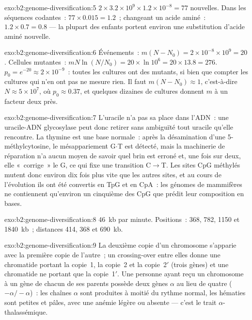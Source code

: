 \begin{solution}{exo:b2:genome-diversification:5}
$2\times 3.2\times 10^{9}\times 1.2\times 10^{-8} = 77$ 
nouvelles. Dans les séquences codantes~: $77\times 0.015 = 1.2$~;
changeant un acide aminé~: $1.2\times 0.7 = 0.8$ --- la plupart des
enfants portent environ une substitution d'acide aminé nouvelle.
\end{solution}

\begin{solution}{exo:b2:genome-diversification:6}
Événements~: $m(N - N_0) = 2\times 10^{-8}\times 10^{9} = 20$. Cellules
mutantes~: $mN\ln(N/N_0) = 20\times \ln 10^{6} = 20\times 13.8 = 276$.
$p_0 = e^{-20} \approx 2\times 10^{-9}$~: toutes les cultures ont des
mutants, si bien que compter les cultures qui n'en ont pas ne mesure
rien. Il faut $m(N -
N_0) \approx 1$, c'est-à-dire $N \approx 5\times 10^{7}$, où $p_0 \approx
0.37$, et quelques dizaines de cultures donnent $m$ à un facteur deux
près.
\end{solution}

\begin{solution}{exo:b2:genome-diversification:7}
L'uracile n'a pas sa place dans l'ADN~: une uracile-ADN glycosylase peut
donc retirer sans ambiguïté tout uracile qu'elle rencontre. La thymine
est une base normale~: après la désamination d'une 5-méthylcytosine, le
mésappariement G$\cdot$T est détecté, mais la machinerie de réparation
n'a aucun moyen de savoir quel brin est erroné et, une fois sur deux,
elle «~corrige~» le G, ce qui fixe une transition C$\to$T. Les sites
CpG méthylés mutent donc environ dix fois plus vite que les autres
sites, et au cours de l'évolution ils ont été convertis en TpG et en
CpA~: les génomes de mammifères ne contiennent qu'environ un cinquième
des CpG que prédit leur composition en bases.
\end{solution}

\begin{solution}{exo:b2:genome-diversification:8}
\qty{46}{kb} par minute. Positions~: 368, 782, 1150 et
\qty{1840}{kb}~; distances 414, 368 et \qty{690}{kb}.
\end{solution}

\begin{solution}{exo:b2:genome-diversification:9}
La deuxième copie d'un chromosome s'apparie avec la première copie de
l'autre~; un crossing-over entre elles donne une chromatide portant la
copie~1, la copie~2 et la copie~2$'$ (trois gènes) et une chromatide ne
portant que la copie~1$'$. Une personne ayant reçu un chromosome à un
gène de chacun de ses parents possède deux gènes $\alpha$ au lieu de
quatre ($-\alpha/-\alpha$)~: les chaînes $\alpha$
sont produites à moitié du rythme normal, les hématies sont petites et
pâles, avec une anémie légère ou absente --- c'est le trait
$\alpha$-thalassémique.
\end{solution}

